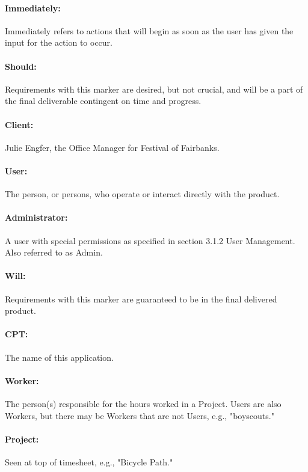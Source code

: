 \documentclass[12pt]{article}
\begin{document}
\paragraph{Immediately:} Immediately refers to actions that will begin as soon as the user has given the input for the action to occur.
\paragraph{Should:} Requirements with this marker are desired, but not crucial, and will be a part of the final deliverable contingent on time and progress.
\paragraph{Client:} Julie Engfer, the Office Manager for Festival of Fairbanks.
\paragraph{User:} The person, or persons, who operate or interact directly with the product.
\paragraph{Administrator:} A user with special permissions as specified in section 3.1.2 User Management. Also referred to as Admin.
\paragraph{Will:} Requirements with this marker are guaranteed to be in the final delivered product.
\paragraph{CPT:} The name of this application.
\paragraph{Worker:} The person(s) responsible for the hours worked in a Project. Users are also Workers, but there may be Workers that are not Users, e.g., "boyscouts."
\paragraph{Project:} Seen at top of timesheet, e.g., "Bicycle Path."
\end{document}
